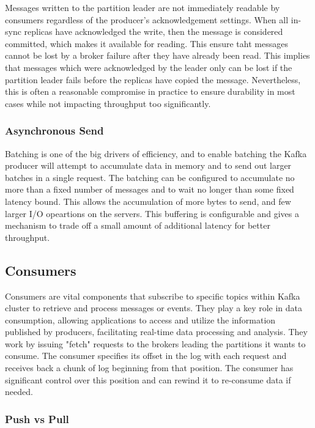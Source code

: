 Messages written to the partition leader are not immediately readable by
consumers regardless of the producer's acknowledgement settings.
When all in-sync replicas have acknowledged the write, then the message is
considered committed, which makes it available for reading.
This ensure taht messages cannot be lost by a broker failure after they have
already been read. This implies that messages which were acknowledged by the
leader only can be lost if the partition leader fails before the replicas have
copied the message. Nevertheless, this is often a reasonable compromise in
practice to ensure durability in most cases while not impacting throughput too
significantly.

\subsubsection{Asynchronous Send}

Batching is one of the big drivers of efficiency, and to enable batching the
Kafka producer will attempt to accumulate data in memory and to send out
larger batches in a single request. The batching can be configured to
accumulate no more than a fixed number of messages and to wait no longer than
some fixed latency bound. This allows the accumulation of more bytes to send,
and few larger I/O opeartions on the servers. This buffering is configurable
and gives a mechanism to trade off a small amount of additional latency for
better throughput.

\subsection{Consumers}

Consumers are vital components that subscribe to specific topics within Kafka
cluster to retrieve and process messages or events. They play a key role in
data consumption, allowing applications to access and utilize the information
published by producers, facilitating real-time data processing and analysis.
They work by issuing "fetch" requests to the brokers leading the partitions it
wants to consume.
The consumer specifies its offset in the log with each request and receives
back a chunk of log beginning from that position.
The consumer has significant control over this position and can rewind it to
re-consume data if needed.

\subsubsection{Push vs Pull}

